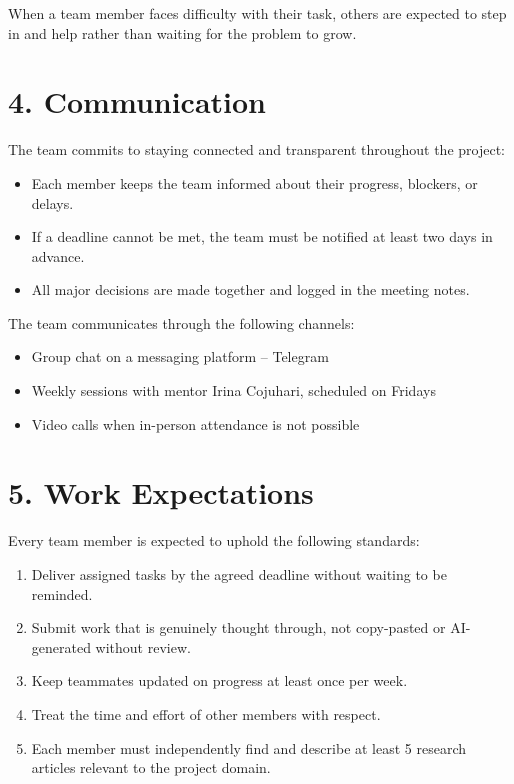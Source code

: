 When a team member faces difficulty with their task, others are expected to step in and help
rather than waiting for the problem to grow.

\section*{4. Communication}

The team commits to staying connected and transparent throughout the project:

\begin{itemize}[leftmargin=2em, label={--}]
    \item Each member keeps the team informed about their progress, blockers, or delays.
    \item If a deadline cannot be met, the team must be notified at least two days in advance.
    \item All major decisions are made together and logged in the meeting notes.
\end{itemize}

The team communicates through the following channels:

\begin{itemize}[leftmargin=2em, label={--}]
    \item Group chat on a messaging platform -- Telegram
    \item Weekly sessions with mentor Irina Cojuhari, scheduled on Fridays
    \item Video calls when in-person attendance is not possible
\end{itemize}

\section*{5. Work Expectations}

Every team member is expected to uphold the following standards:

\begin{enumerate}[leftmargin=2em]
    \item Deliver assigned tasks by the agreed deadline without waiting to be reminded.
    \item Submit work that is genuinely thought through, not copy-pasted or AI-generated without review.
    \item Keep teammates updated on progress at least once per week.
    \item Treat the time and effort of other members with respect.
    \item Each member must independently find and describe at least 5 research articles relevant to the project domain.
\end{enumerate}

